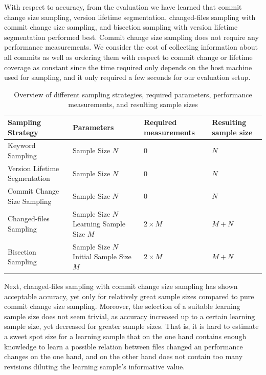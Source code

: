 With respect to accuracy, from the evaluation we have learned that commit
change size sampling, version lifetime segmentation, changed-files sampling with
commit change size sampling, and bisection sampling with version lifetime segmentation performed best.
Commit change size sampling does not require any performance measurements. We
consider the cost of collecting information about all commits as well as
ordering them with respect to commit change or lifetime coverage as constant
since the time required only depends on the host machine used for sampling, and it only
required a few seconds for our evaluation setup. 

\begin{table}[t!]
\centering
\begin{tabular}{C{3cm}L{5cm}L{3cm}L{3cm}}
\toprule
 \textbf{Sampling Strategy} & \textbf{Parameters} & \textbf{Required
 measurements} & \textbf{Resulting sample size} \\
 \midrule
 Keyword Sampling & Sample Size $N$ & $0$ & $N$\\
 \midrule 
 Version Lifetime Segmentation & Sample Size $N$ & $0$ & $N$\\
 \midrule 
  Commit Change Size Sampling & Sample Size $N$ & $0$ & $N$\\
 \midrule 
  Changed-files Sampling & {Sample Size $N$\linebreak Learning Sample Size $M$}
  & $2\times M$ & $M + N$
  \\
 \midrule 
  Bisection Sampling & {Sample Size $N$\linebreak Initial Sample Size $M$} &
  $2\times M$ & $M + N$
  \\
 \bottomrule
\end{tabular}
\caption{Overview of different sampling strategies, required parameters,
performance measurements, and resulting sample sizes}
\label{tab:revsampling_overview}
\end{table}

Next, changed-files sampling with commit change size sampling has shown
acceptable accuracy, yet only for relatively great sample sizes compared to
pure commit change size sampling. Moreover, the selection of a suitable
learning sample size does not seem trivial, as accuracy increased up to a
certain learning sample size, yet decreased for greater sample sizes. That is,
it is hard to estimate a sweet spot size for a learning sample that on the one
hand contains enough knowledge to learn a possible relation between files
changed an performance changes on the one hand, and on the other hand does not
contain too many revisions diluting the learning sample's informative value. 

